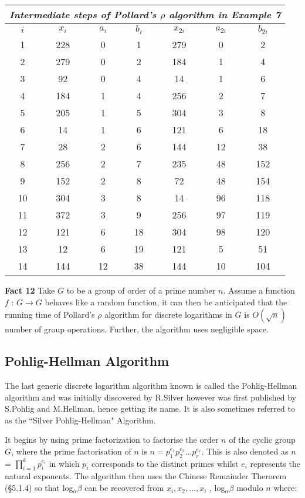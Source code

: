 \documentclass[iwp,first]{luthesis}
\begin{document}
\begin{center}
\begin{tabular}{|c||c|c|c||c|c|c|}
\hline
\multicolumn{7}{|c|}{\textit{Intermediate steps of Pollard's $\rho$ algorithm in Example 7}}\\
\hline
$i$ & $x_{i}$ & $a_{i}$ & $b_{i}$ & $x_{2i}$ & $a_{2i}$ & $b_{2i}$ \\ \hline\hline
1 & 228 & 0 & 1 & 279 & 0 & 2 \\ 
2 & 279 & 0 & 2 & 184 & 1 & 4 \\
3 & 92 & 0 & 4 & 14 & 1 & 6 \\
4 & 184 & 1 & 4 & 256 & 2 & 7 \\
5 & 205 & 1 & 5 & 304 & 3 & 8 \\
6 & 14 & 1 & 6 & 121 & 6 & 18 \\
7 & 28 & 2 & 6 & 144 &  12 & 38 \\
8 & 256 & 2 & 7 & 235 & 48 & 152 \\
9 & 152 & 2 & 8 & 72 & 48 & 154 \\
10 & 304 & 3 & 8 & 14 & 96 & 118 \\
11 & 372 & 3 & 9 & 256 & 97 & 119 \\
12 & 121 & 6 & 18 & 304 & 98 & 120 \\
13 & 12 & 6 & 19 & 121 & 5 & 51 \\
14 & 144 & 12 & 38 & 144 & 10 & 104 \\
\hline
\end{tabular}
\end{center}

\textbf{Fact 12} Take $G$ to be a group of order of a prime number $n$. Assume a function $f$ : $G \longrightarrow G$ behaves like a random function, it can then be anticipated that the running time of Pollard's $\rho$ algorithm for discrete logarithms in $G$ is $O(\sqrt{n})$ number of group operations. Further, the algorithm uses negligible space.

\subsection{Pohlig-Hellman Algorithm}

The last generic discrete logarithm algorithm known is called the Pohlig-Hellman algorithm and was initially discovered by R.Silver however was first published by S.Pohlig and M.Hellman, hence getting its name. It is also sometimes referred to as the ``Silver Pohlig-Hellman" Algorithm. 

It begins by using prime factorization to factorise the order $n$ of the cyclic group $G$, where the prime factorisation of $n$ is $n = p_{1}^{e_1}p_{2}^{e_2}...p_{r}^{e_r}$. This is also denoted as $n$ = $\displaystyle\prod\limits_{i = 1}^{k} p_{i}^{e_i}$ in which $p_i$ corresponds to the distinct primes whilst $e_i$ represents the natural exponents. The algorithm then uses the Chinese Remainder Therorem (\S5.1.4) so that log$_{\alpha}\beta$ can be recovered from $x_i, x_2,...,x_i$ , log$_{\alpha}\beta$ modulo $n$ where:
\end{document}
